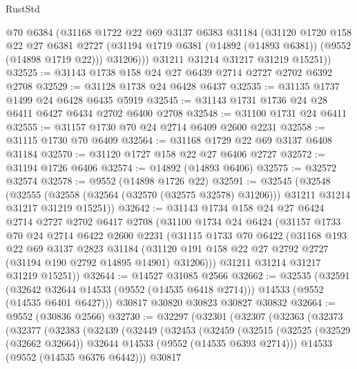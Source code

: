 \begin{lexlean}{RustStd}
\begin{coremodule}
          @70
          @6384
          (@31168
            @1722
            @22
            @69
            @3137
            @6383
            @31184
            (@31120
              @1720
              @158
              @22
              @27
              @6381
              @2727
              (@31194 @1719 @6381 (@14892 (@14893 @6381)) (@9552 (@14898 @1719 @22)))
              @31206)))
        @31211
        @31214
        @31217
        @31219
        @15251))
@32525 := @31143 @1738 @158 @24 @27 @6439 @2714 @2727 @2702 @6392 @2708
@32529 := @31128 @1738 @24 @6428 @6437
@32535 := @31135 @1737 @1499 @24 @6428 @6435 @5919
@32545 := @31143 @1731 @1736 @24 @28 @6411 @6427 @6434 @2702 @6400 @2708
@32548 := @31100 @1731 @24 @6411
@32555 := @31157 @1730 @70 @24 @2714 @6409 @2600 @2231
@32558 := @31115 @1730 @70 @6409
@32564 := @31168 @1729 @22 @69 @3137 @6408 @31184
@32570 := @31120 @1727 @158 @22 @27 @6406 @2727
@32572 := @31194 @1726 @6406
@32574 := @14892 (@14893 @6406)
@32575 := @32572 @32574
@32578 := @9552 (@14898 @1726 @22)
@32591 := @32545
    (@32548
      (@32555 (@32558 (@32564 (@32570 (@32575 @32578) @31206))) @31211 @31214 @31217 @31219 @15251))
@32642 := @31143
    @1734
    @158
    @24
    @27
    @6424
    @2714
    @2727
    @2702
    @6417
    @2708
    (@31100
      @1734
      @24
      @6424
      (@31157
        @1733
        @70
        @24
        @2714
        @6422
        @2600
        @2231
        (@31115
          @1733
          @70
          @6422
          (@31168
            @193
            @22
            @69
            @3137
            @2823
            @31184
            (@31120 @191 @158 @22 @27 @2792 @2727 (@31194 @190 @2792 @14895 @14901) @31206)))
        @31211
        @31214
        @31217
        @31219
        @15251))
@32644 := @14527 @31085 @2566
@32662 := @32535
    (@32591 (@32642 @32644 @14533 (@9552 (@14535 @6418 @2714))) @14533 (@9552 (@14535 @6401 @6427)))
    @30817
    @30820
    @30823
    @30827
    @30832
@32664 := @9552 (@30836 @2566)
@32730 := @32297
    (@32301
      (@32307
        (@32363
          (@32373
            (@32377
              (@32383
                (@32439
                  (@32449
                    (@32453
                      (@32459
                        (@32515
                          (@32525
                            (@32529 (@32662 @32664))
                            @32644
                            @14533
                            (@9552 (@14535 @6393 @2714)))
                          @14533
                          (@9552 (@14535 @6376 @6442)))
                        @30817

\end{coremodule}
\end{lexlean}
